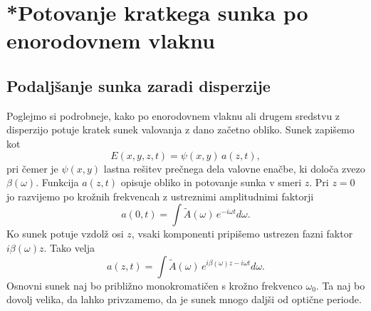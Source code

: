 \section{*Potovanje kratkega sunka po enorodovnem vlaknu}
\label{chap:sunvl}
\subsection*{Podaljšanje sunka zaradi disperzije}
Poglejmo si podrobneje, kako po enorodovnem vlaknu ali drugem
sredstvu z disperzijo potuje kratek sunek valovanja z dano začetno obliko.
Sunek zapišemo kot  
\begin{equation}
E\left(x, y, z, t\right)=\psi\left(x,y\right)\, a\left(z,t\right)\!,
\label{9.61}
\end{equation}
pri čemer je $\psi\left(x,y\right)$ lastna rešitev prečnega dela valovne
enačbe, ki določa zvezo $\beta\left(\omega\right)$. 
Funkcija $a\left(z,t\right)$ opisuje obliko in potovanje sunka v smeri $z$. 
Pri $z=0$ jo razvijemo po krožnih frekvencah z ustreznimi amplitudnimi faktorji 
\begin{equation}
a\left(0,t\right)=\int \tilde{A}(\omega)\, e^{- i\omega t}d\omega.
\label{9.62}
\end{equation}
Ko sunek potuje vzdolž osi $z$, vsaki komponenti pripišemo
ustrezen fazni faktor $i \beta (\omega) z$. Tako velja
\begin{equation}
a\left(z,t\right)=\int \tilde{A}(\omega)\, e^{i \beta (\omega) z - i\omega t}d\omega.
\label{9.62f}
\end{equation}
Osnovni sunek naj bo približno monokromatičen s krožno frekvenco $\omega_{0}$. Ta naj bo dovolj 
velika, da lahko privzamemo, da je sunek mnogo daljši od optične periode.

